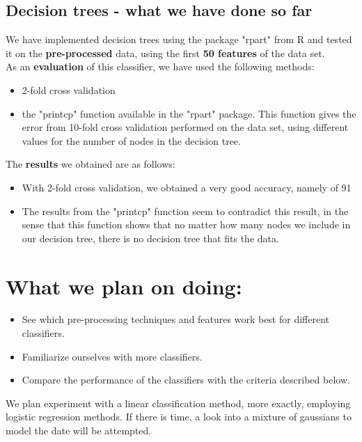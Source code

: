 \documentclass[a4paper,11pt]{article}
\begin{document}
\subsection*{Decision trees - what we have done so far}
	We have implemented decision trees using the package "rpart" from R and tested it on the \textbf{pre-processed} data, using the first \textbf{50 features} of the data set. \\
	As an \textbf{evaluation} of this classifier, we have used the following methods:
	\begin{itemize}
		\item 2-fold cross validation
		\item the "printcp" function available in the "rpart" package. This function gives the error from 10-fold cross validation performed on the data set, using different values for the number of nodes in the decision tree. 
	\end{itemize}
	The \textbf{results} we obtained are as follows:
	\begin{itemize}
		\item With 2-fold cross validation, we obtained a very good accuracy, namely of 91%
		\item The results from the "printcp" function seem to contradict this result, in the sense that this function shows that no matter how many nodes we include in our decision tree, there is no decision tree that fits the data.
	\end{itemize}
	
	
	
	

\section*{What we plan on doing:}
\begin{itemize}
	\item See which pre-processing techniques and features work best for different classifiers.
	\item Familiarize ourselves with more classifiers.
	\item Compare the performance of the classifiers with the criteria described below.
\end{itemize}

We plan experiment with a linear classification method, more exactly, employing logistic regression methods. If there is time, a look into a mixture of gaussians to model the date will be attempted. 
\end{document}
